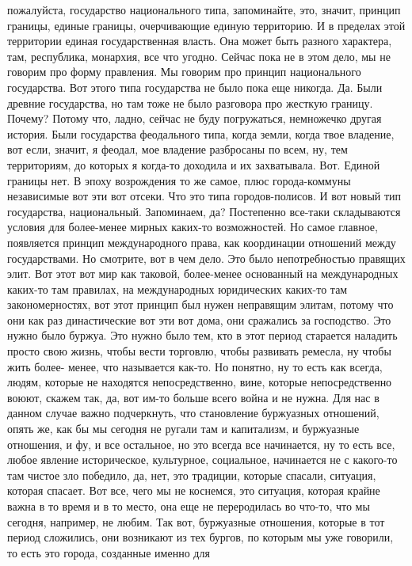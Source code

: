 пожалуйста, государство национального типа, запоминайте, это, значит, принцип
границы, единые границы, очерчивающие единую территорию. И в пределах этой
территории единая государственная власть. Она может быть разного характера, там,
республика, монархия, все что угодно. Сейчас пока не в этом дело, мы не говорим
про форму правления. Мы говорим про принцип национального государства. Вот этого
типа государства не было пока еще никогда. Да. Были древние государства, но там
тоже не было разговора про жесткую границу. Почему? Потому что, ладно, сейчас не
буду погружаться, немножечко другая история. Были государства феодального типа,
когда земли, когда твое владение, вот если, значит, я феодал, мое владение
разбросаны по всем, ну, тем территориям, до которых я когда-то доходила и их
захватывала. Вот. Единой границы нет. В эпоху возрождения то же самое, плюс
города-коммуны независимые вот эти вот отсеки. Что это типа городов-полисов. И
вот новый тип государства, национальный. Запоминаем, да? Постепенно все-таки
складываются условия для более-менее мирных каких-то возможностей. Но самое
главное, появляется принцип международного права, как координации отношений
между государствами. Но смотрите, вот в чем дело. Это было непотребностью
правящих элит. Вот этот вот мир как таковой, более-менее основанный на
международных каких-то там правилах, на международных юридических каких-то там
закономерностях, вот этот принцип был нужен неправящим элитам, потому что они
как раз династические вот эти вот дома, они сражались за господство. Это нужно
было буржуа. Это нужно было тем, кто в этот период старается наладить просто
свою жизнь, чтобы вести торговлю, чтобы развивать ремесла, ну чтобы жить более-
менее, что называется как-то. Но понятно, ну то есть как всегда, людям, которые
не находятся непосредственно, вине, которые непосредственно воюют, скажем так,
да, вот им-то больше всего война и не нужна. Для нас в данном случае важно
подчеркнуть, что становление буржуазных отношений, опять же, как бы мы сегодня
не ругали там и капитализм, и буржуазные отношения, и фу, и все остальное, но
это всегда все начинается, ну то есть все, любое явление историческое,
культурное, социальное, начинается не с какого-то там чистое зло победило, да,
нет, это традиции, которые спасали, ситуация, которая спасает. Вот все, чего мы
не коснемся, это ситуация, которая крайне важна в то время и в то место, она еще
не переродилась во что-то, что мы сегодня, например, не любим. Так вот,
буржуазные отношения, которые в тот период сложились, они возникают из тех
бургов, по которым мы уже говорили, то есть это города, созданные именно для
